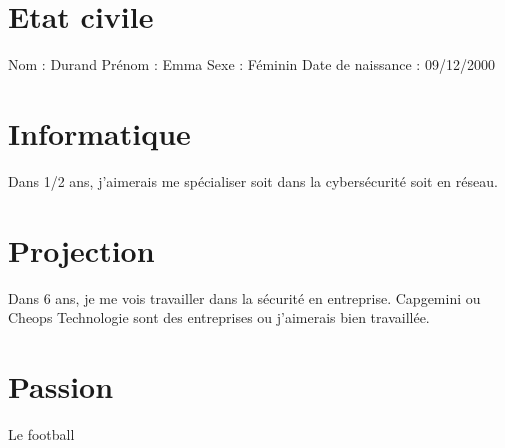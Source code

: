 \documentclass[a4paper,12pt]{article}
\begin{document}
\section{Etat civile}
Nom : Durand
\newline
Prénom : Emma
\newline
Sexe : Féminin
\newline
Date de naissance : 09/12/2000


\section{Informatique}
Dans 1/2 ans, j'aimerais me spécialiser soit dans la cybersécurité soit en réseau.

\section{Projection}
Dans 6 ans, je me vois travailler dans la sécurité en entreprise. Capgemini ou Cheops Technologie sont des entreprises ou j'aimerais bien travaillée.

\section{Passion}
Le football 
\end{document}
